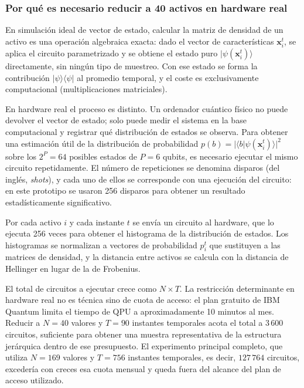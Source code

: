\subsubsection{Por qué es necesario reducir a 40 activos en hardware real}
\label{subsubsec:reduccion_40_activos}

En simulación ideal de vector de estado, calcular la matriz de densidad de un activo es una operación algebraica exacta: dado el vector de características $\mathbf{x}_i^t$, se aplica el circuito parametrizado y se obtiene el estado puro $|\psi(\mathbf{x}_i^t)\rangle$ directamente, sin ningún tipo de muestreo. Con ese estado se forma la contribución $|\psi\rangle\langle\psi|$ al promedio temporal, y el coste es exclusivamente computacional (multiplicaciones matriciales).

En hardware real el proceso es distinto. Un ordenador cuántico físico no puede devolver el vector de estado; solo puede medir el sistema en la base computacional y registrar qué distribución de estados se observa. Para obtener una estimación útil de la distribución de probabilidad $p(b) = |\langle b|\psi(\mathbf{x}_i^t)\rangle|^2$ sobre los $2^P = 64$ posibles estados de $P=6$ qubits, es necesario ejecutar el mismo circuito repetidamente. El número de repeticiones se denomina disparos (del inglés, \textit{shots}), y cada uno de ellos se corresponde con una ejecución del circuito: en este prototipo se usaron 256 disparos para obtener un resultado estadísticamente significativo.

Por cada activo $i$ y cada instante $t$ se envía un circuito al hardware, que lo ejecuta 256 veces para obtener el histograma de la distribución de estados. Los histogramas se normalizan a vectores de probabilidad $p_i^t$ que sustituyen a las matrices de densidad, y la distancia entre activos se calcula con la distancia de Hellinger en lugar de la de Frobenius.

El total de circuitos a ejecutar crece como $N \times T$. La restricción determinante en hardware real no es técnica sino de cuota de acceso: el plan gratuito de IBM Quantum limita el tiempo de QPU a aproximadamente 10 minutos al mes. Reducir a \(N=40\) valores y \(T=90\) instantes temporales acota el total a $3\,600$ circuitos, suficiente para obtener una muestra representativa de la estructura jerárquica dentro de ese presupuesto. El experimento principal completo, que utiliza \(N=169\) valores y \(T=756\) instantes temporales, es decir, $127\,764$ circuitos, excedería con creces esa cuota mensual y queda fuera del alcance del plan de acceso utilizado.


